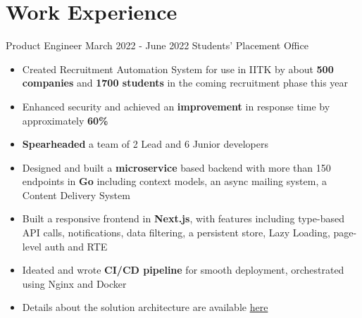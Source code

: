 \section*{\sc Work Experience}
\vspace{-2mm}
\hrulefill
\vspace{1mm}

\excventry
{Product Engineer}
{March 2022 - June 2022}
{Students' Placement Office}
{
  \begin{itemize}
    \item Created Recruitment Automation System for use in IITK by about \textbf{500 companies} and \textbf{1700 students} in the coming recruitment phase this year  
    \item Enhanced security and achieved an \textbf{improvement} in response time by approximately \textbf{60\%}
    \item \textbf{Spearheaded} a team of 2 Lead and 6 Junior developers
    \item Designed and built a \textbf{microservice} based backend with more than 150 endpoints in \textbf{Go} including context models, an async mailing system, a Content Delivery System  
    \item Built a responsive frontend in \textbf{Next.js}, with features including type-based API calls, notifications, data filtering, a persistent store, Lazy Loading, page-level auth and RTE
    \item Ideated and wrote \textbf{CI/CD pipeline} for smooth deployment, orchestrated using Nginx and Docker
    \item Details about the solution architecture are available \href{https://abhishekshree.xyz/blog/engineering-ras}{here {\small \faExternalLink{}}}
  \end{itemize}
}


